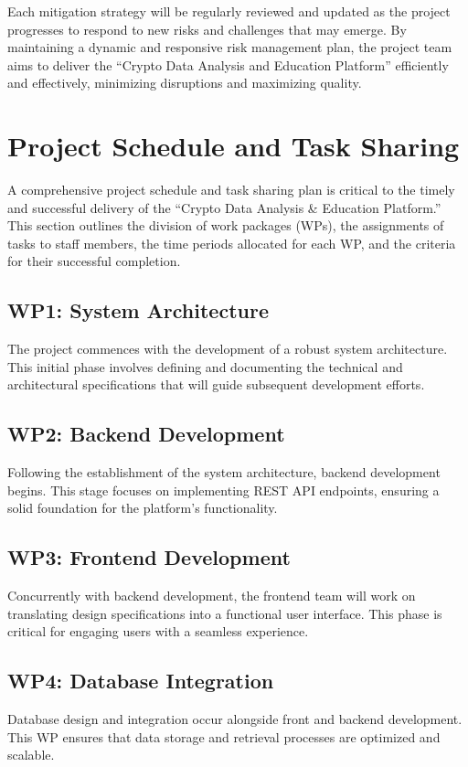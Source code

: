 \documentclass[12pt]{report}
\begin{document}
Each mitigation strategy will be regularly reviewed and updated as the project progresses to respond to new risks and challenges that may emerge. By maintaining a dynamic and responsive risk management plan, the project team aims to deliver the ``Crypto Data Analysis and Education Platform'' efficiently and effectively, minimizing disruptions and maximizing quality.


\section{Project Schedule and Task Sharing}
A comprehensive project schedule and task sharing plan is critical to the timely and successful delivery of the ``Crypto Data Analysis \& Education Platform.'' This section outlines the division of work packages (WPs), the assignments of tasks to staff members, the time periods allocated for each WP, and the criteria for their successful completion.

\subsection{WP1: System Architecture}
The project commences with the development of a robust system architecture. This initial phase involves defining and documenting the technical and architectural specifications that will guide subsequent development efforts.

\subsection{WP2: Backend Development}
Following the establishment of the system architecture, backend development begins. This stage focuses on implementing REST API endpoints, ensuring a solid foundation for the platform's functionality.

\subsection{WP3: Frontend Development}
Concurrently with backend development, the frontend team will work on translating design specifications into a functional user interface. This phase is critical for engaging users with a seamless experience.

\subsection{WP4: Database Integration}
Database design and integration occur alongside front and backend development. This WP ensures that data storage and retrieval processes are optimized and scalable.
\end{document}
